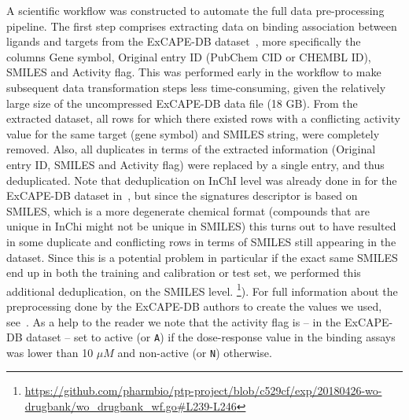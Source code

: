 \documentclass[utf8]{frontiersSCNS} %
\begin{document}
A scientific workflow was constructed to automate the full data
pre-processing pipeline. The first step comprises extracting data on binding
association between ligands and targets from the ExCAPE-DB
dataset~\cite{Sun2017}, more specifically the columns Gene symbol, Original
entry ID (PubChem CID or CHEMBL ID), SMILES and Activity flag. This was
performed early in the workflow to make subsequent data transformation steps
less time-consuming, given the relatively large size of the uncompressed
ExCAPE-DB data file (18 GB). From the extracted dataset, all rows for which
there existed rows with a conflicting activity value for the same target
(gene symbol) and SMILES string, were completely removed. Also, all duplicates
in terms of the extracted information (Original entry ID, SMILES and Activity flag)
were replaced by a single entry, and thus deduplicated.
%
Note that deduplication on InChI level was already done in for the ExCAPE-DB
dataset in~\cite{Sun2017}, but since the signatures descriptor is based on
SMILES, which is a more degenerate chemical format (compounds that are unique in
InChi might not be unique in SMILES) this turns out to have resulted in some
duplicate and conflicting rows in terms of SMILES still appearing in the
dataset. Since this is a potential problem in particular if the exact same
SMILES end up in both the training and calibration or test set, we performed
this additional deduplication, on the SMILES level.
\footnote{\url{https://github.com/pharmbio/ptp-project/blob/c529cf/exp/20180426-wo-drugbank/wo\_drugbank\_wf.go\#L239-L246}}).
%
For full information about the preprocessing done by the ExCAPE-DB authors to
create the values we used, see~\cite{Sun2017}. As a help to the reader we
note that the activity flag is -- in the ExCAPE-DB dataset -- set to active
(or \texttt{A}) if the dose-response value in the binding assays was lower
than 10 ${\mu}M$ and non-active (or \texttt{N}) otherwise.
\end{document}
